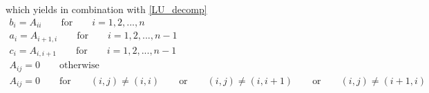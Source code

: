 \documentclass[english,notitlepage]{revtex4-1}  %
\begin{document}
which yields in combination with \eqref{LU_decomp}
\begin{gather}
	b_i = A_{ii} \qquad \text{for} \qquad i = 1,2,...,n \\
	a_i = A_{i+1,i} \qquad \text{for} \qquad i = 1,2,...,n-1 \\
	c_i = A_{i, i+1} \qquad \text{for} \qquad i = 1,2,...,n-1\\ 
	A_{ij} = 0 \qquad \text{otherwise}\\
	A_{ij} = 0 \qquad \text{for} \qquad (i,j) \neq (i,i) \qquad  \text{or} \qquad (i,j) \neq (i,i+1) \qquad \text{or} \qquad (i,j) \neq (i+1,i)
\end{gather}
\end{document}
